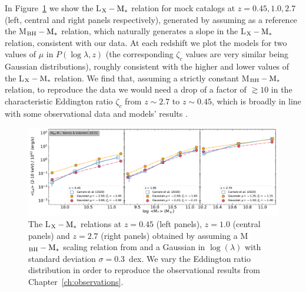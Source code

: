 In Figure~\ref{fig:LX_M_redshift} we show the L$_{\rm X}-{\rm M}_*$ relation for mock catalogs at $z=0.45,1.0,2.7$ (left, central and right panels respectively), generated by assuming as a reference the \citet{2015ApJ...813...82R} M$_{\rm BH}-{\rm M}_*$ relation, which naturally generates a slope in the L$_{\rm X}-{\rm M}_*$ relation, consistent with our data. 
 At each redshift we plot the models for two values of $\mu$ in $P(\log \lambda,z)$ (the corresponding $\zeta_c$ values are very similar being Gaussian distributions), roughly consistent with the higher and lower values of the L$_{\rm X}-{\rm M}_*$ relation.
We find that, assuming a strictly constant M$_{\rm BH}-{\rm M}_*$ relation, to reproduce the data we would need a drop of a factor of $\gtrsim 10$ in the characteristic Eddington ratio $\zeta_c$ from $z\sim 2.7$ to $z\sim 0.45$, which is broadly in line with some observational data and models' results \citep[see, e.g., Fig. 12 in][]{Shankar13Acc}. 

\begin{figure}
\begin{center}
  \includegraphics[width=\textwidth]{Figs/Chapter3/fig3.pdf}
  \caption{The L$_{\rm X}-{\rm M}_*$ relations at $z=0.45$ (left panels), $z=1.0$ (central panels) and $z=2.7$ (right panels) obtained by assuming a M$_{\rm BH}-{\rm M}_*$ scaling relation from \citet{2015ApJ...813...82R} and a Gaussian in $\log (\lambda)$ with standard deviation $\sigma=0.3$~dex. We vary the Eddington ratio distribution in order to reproduce the observational results from Chapter~\ref{ch:observations}. }

    \label{fig:LX_M_redshift}
\end{center}
\end{figure}


